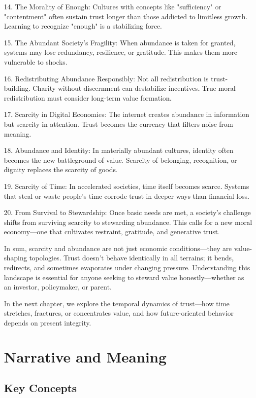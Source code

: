 \documentclass[11pt,oneside]{book}
\begin{document}
14. The Morality of Enough: Cultures with concepts like "sufficiency" or "contentment" often sustain trust longer than those addicted to limitless growth. Learning to recognize "enough" is a stabilizing force.

15. The Abundant Society’s Fragility: When abundance is taken for granted, systems may lose redundancy, resilience, or gratitude. This makes them more vulnerable to shocks.

16. Redistributing Abundance Responsibly: Not all redistribution is trust-building. Charity without discernment can destabilize incentives. True moral redistribution must consider long-term value formation.

17. Scarcity in Digital Economies: The internet creates abundance in information but scarcity in attention. Trust becomes the currency that filters noise from meaning.

18. Abundance and Identity: In materially abundant cultures, identity often becomes the new battleground of value. Scarcity of belonging, recognition, or dignity replaces the scarcity of goods.

19. Scarcity of Time: In accelerated societies, time itself becomes scarce. Systems that steal or waste people’s time corrode trust in deeper ways than financial loss.

20. From Survival to Stewardship: Once basic needs are met, a society's challenge shifts from surviving scarcity to stewarding abundance. This calls for a new moral economy—one that cultivates restraint, gratitude, and generative trust.

In sum, scarcity and abundance are not just economic conditions—they are value-shaping topologies. Trust doesn’t behave identically in all terrains; it bends, redirects, and sometimes evaporates under changing pressure. Understanding this landscape is essential for anyone seeking to steward value honestly—whether as an investor, policymaker, or parent.

In the next chapter, we explore the temporal dynamics of trust—how time stretches, fractures, or concentrates value, and how future-oriented behavior depends on present integrity.


\chapter{ Narrative and Meaning}

\section{Key Concepts}
\end{document}
